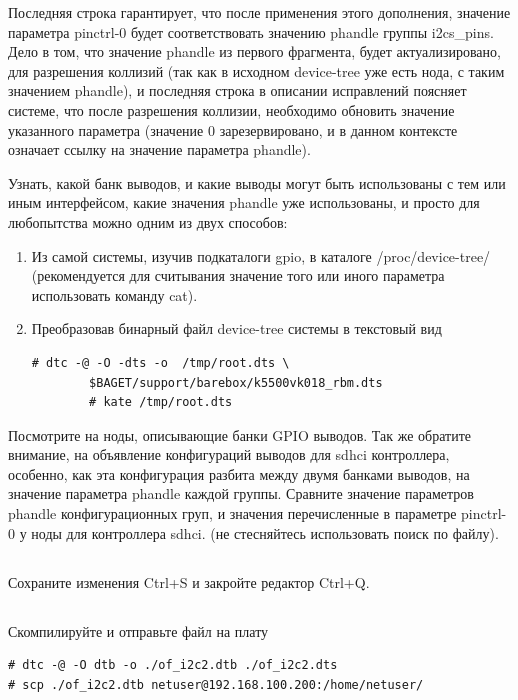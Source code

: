 Последняя строка гарантирует, что после применения этого дополнения, значение параметра pinctrl-0 будет соответствовать значению phandle группы i2cs\_pins. Дело в том, что значение phandle из первого фрагмента, будет  актуализировано, для разрешения коллизий (так как в исходном device-tree уже есть нода, с таким значением phandle), и последняя строка в описании исправлений поясняет системе, что после разрешения коллизии, необходимо обновить значение указанного параметра (значение 0 зарезервировано, и в данном контексте означает ссылку на значение параметра phandle).  

Узнать, какой банк выводов, и какие выводы могут быть использованы с тем или иным интерфейсом, какие значения phandle уже использованы, и просто для любопытства можно одним из двух способов:

\begin{enumerate}
	\item Из самой системы, изучив подкаталоги gpio, в каталоге /proc/device-tree/ (рекомендуется для считывания значение того или иного параметра использовать команду cat). 
	
	\item Преобразовав бинарный файл device-tree системы в текстовый вид 
	\begin{lstlisting}[style=bash]
		# dtc -@ -O -dts -o  /tmp/root.dts \
		$BAGET/support/barebox/k5500vk018_rbm.dts
		# kate /tmp/root.dts
	\end{lstlisting}
\end{enumerate}

Посмотрите на ноды, описывающие банки GPIO выводов. Так же обратите внимание, на объявление конфигураций выводов для sdhci контроллера, особенно, как эта конфигурация разбита между двумя банками выводов, на значение параметра phandle каждой группы. Сравните значение параметров phandle конфигурационных груп, и значения перечисленные в параметре pinctrl-0 у ноды для контроллера  sdhci. (не стесняйтесь использовать поиск по файлу).

\subsection{} Сохраните изменения Ctrl+S и закройте редактор Ctrl+Q. 

\subsection{} Скомпилируйте и отправьте файл на плату
\begin{lstlisting}[style=bash]
# dtc -@ -O dtb -o ./of_i2c2.dtb ./of_i2c2.dts
# scp ./of_i2c2.dtb netuser@192.168.100.200:/home/netuser/
\end{lstlisting}

